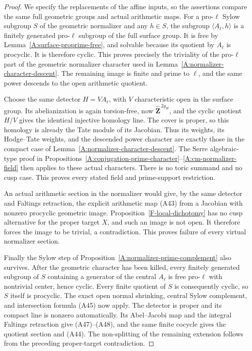 \begin{proof}
We specify the replacements of the affine
inputs, so the assertions compare the same
full geometric groups and actual arithmetic
maps. For a pro-$\ell$ Sylow subgroup $S$
of the geometric normalizer and any $h\in S$,
the subgroup $\langle A_\ell,h\rangle$ is a
finitely generated pro-$\ell$ subgroup of the
full surface group. It is free by
Lemma~\ref{A:surface-proprime-free}, and
solvable because its quotient by $A_\ell$
is procyclic. It is therefore cyclic.
This proves precisely the triviality of the
pro-$\ell$ part of the geometric normalizer
character used in
Lemma~\ref{A:normalizer-character-descent}.
The remaining image is finite and prime to
$\ell$, and the same power descends to the
open arithmetic quotient.

Choose the same detector $H=V A_\ell$, with
$V$ characteristic open in the surface group.
Its abelianization is again torsion-free,
now $\widehat{\mathbf Z}^{\,2g_H}$, and the
cyclic quotient $H/V$ gives the identical
injective homology line. The cover is proper,
so this homology is already the Tate module
of its Jacobian. Thus its weights, its
Hodge--Tate weights, and the descended power
character are exactly those in the compact
case of Lemma~\ref{A:normalizer-character-descent}.
The Serre algebraic-type proof in
Propositions~\ref{A:conjugation-prime-character}--\ref{A:cm-normalizer-field}
then applies to these actual characters.
There is no toric summand and no cusp case.
This proves every stated field and prime-support
restriction.

An actual arithmetic section in the normalizer
would give, by the same detector and Faltings
retraction, the explicit arithmetic map
(A43) from a Jacobian with nonzero procyclic
geometric image. Proposition~\ref{F-local-dichotomy}
has no cusp alternative for the proper
target $X$, and such an image is not open.
It therefore forces the image to be trivial,
a contradiction. This proves failure of
every virtual normalizer section.

Finally the Sylow step of
Proposition~\ref{A:normalizer-prime-complement}
also survives. After the geometric character
has been killed, every finitely generated
subgroup of $S$ containing a generator of
the central $A_\ell$ is free pro-$\ell$ with
nontrivial center, hence cyclic. Every finite
quotient of $S$ is consequently cyclic,
so $S$ itself is procyclic. The exact open
normal shrinking, central Sylow complement,
and intersection formula (A45) now apply.
The detector is proper and its compact line
is nonzero automatically. Its Abel--Jacobi
map and the integral Faltings retraction
give (A47)--(A48), and the same finite
cocycle gives the quotient section and
(A44). The non-splitting of the remaining
extension follows from the preceding
proper-target contradiction.
\end{proof}

